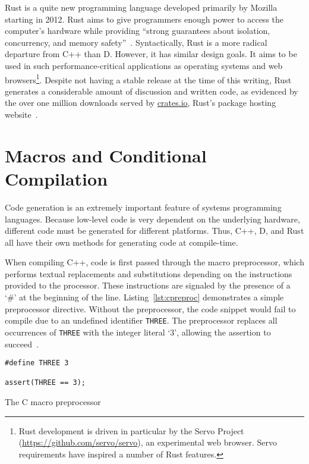 \documentclass[finalcopy]{srpaper}
\begin{document}
Rust is a quite new programming language developed primarily by Mozilla
starting in 2012. Rust aims to give programmers enough power to access the
computer's hardware while providing ``strong guarantees about isolation,
concurrency, and memory safety''~\cite{Matsakis:2014:RL:2663171.2663188}.
Syntactically, Rust is a more radical departure from C++ than D. However, it
has similar design goals. It aims to be used in such performance-critical
applications as operating systems and web browsers\footnote{Rust development is
driven in particular by the Servo Project
(\url{https://github.com/servo/servo}), an experimental web browser. Servo
requirements have inspired a number of Rust features.}. Despite
not having a stable release at the time of this writing, Rust generates a
considerable amount of discussion and written code, as evidenced by the over
one million downloads served by \url{crates.io}, Rust's package hosting
website~\cite{Cratesio}.

\section{Macros and Conditional Compilation}

Code generation is an extremely important feature of systems programming
languages. Because low-level code is very dependent on the underlying
hardware, different code must be generated for different platforms. Thus, C++,
D, and Rust all have their own methods for generating code at compile-time.

When compiling C++, code is first passed through the macro preprocessor, which
performs textual replacements and substitutions depending on the instructions
provided to the processor. These instructions are signaled by the presence of a
`\#' at the beginning of the line. Listing~\ref{lst:cpreproc} demonstrates a
simple preprocessor directive. Without the preprocessor, the code snippet would
fail to compile due to an undefined identifier \texttt{THREE}. The preprocessor
replaces all occurrences of \texttt{THREE} with the integer literal `3',
allowing the assertion to succeed~\cite{CppReference}.

\begin{listing}[H]
\begin{verbatim}
#define THREE 3

assert(THREE == 3);
\end{verbatim}
\caption{The C macro preprocessor}
\label{lst:cpreproc}
\end{listing}
\end{document}
